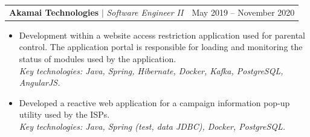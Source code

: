 \documentclass[letterpaper,11pt]{article}
\makeatletter
\newcommand{\resumeProjectHeading}[2]{
    \item
    \begin{tabular*}{0.97\textwidth}{l@{\extracolsep{\fill}}r}
      \small#1 & #2 \\
    \end{tabular*}\vspace{-7pt}
}
\makeatother
\begin{document}
          \resumeProjectHeading
          {\textbf{Akamai Technologies} $|$ \footnotesize\emph{Software Engineer II}\vspace{8pt}}{May 2019 -- November 2020}
          {\small{
            \begin{itemize}
                \item \justifying
Development within a website access restriction application used for parental control. The application portal is responsible for loading and monitoring the status of modules used by the application. \\
                 \textit{Key technologies: Java, Spring, Hibernate, Docker, Kafka, PostgreSQL, AngularJS.}
                \item \justifying Developed a reactive web application for a campaign information pop-up utility used by the ISPs. \\ 
                \textit{Key technologies: Java, Spring (test, data JDBC), Docker, PostgreSQL.}
            \end{itemize}
            }
            }
\end{document}
